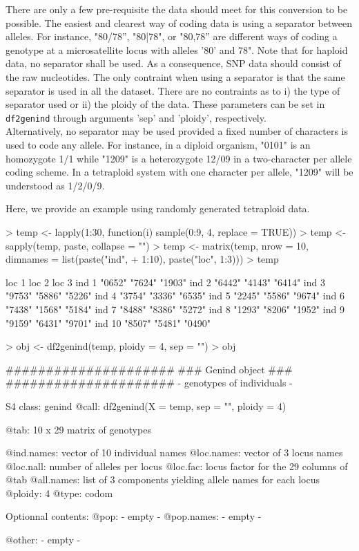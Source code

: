 \documentclass{article}
\begin{document}
There are only a few pre-requisite the data should meet for this conversion to be possible. The
easiest and clearest way of coding data is using a separator between alleles. For instance,
"80/78'', "80|78", or "80,78'' are different ways of coding a genotype at a microsatellite locus
with alleles '80' and 78".
Note that for haploid data, no separator shall be used.
As a consequence, SNP data should consist of the raw nucleotides.
The only contraint when using a separator is that the same separator is used in all the
dataset. There are no contraints as to i) the type of separator used or ii) the ploidy of the data.
These parameters can be set in \texttt{df2genind} through arguments 'sep' and 'ploidy', respectively.
\\

Alternatively, no separator may be used provided a fixed number of characters is used to code any allele.
For instance, in a diploid organism, "0101" is an homozygote 1/1 while "1209" is a heterozygote
12/09 in a two-character per allele coding scheme.
In a tetraploid system with one character per allele, "1209" will be understood as 1/2/0/9.

Here, we provide an example using randomly generated tetraploid data.
\begin{Schunk}
\begin{Sinput}
> temp <- lapply(1:30, function(i) sample(0:9, 4, replace = TRUE))
> temp <- sapply(temp, paste, collapse = "")
> temp <- matrix(temp, nrow = 10, dimnames = list(paste("ind", 
+     1:10), paste("loc", 1:3)))
> temp
\end{Sinput}
\begin{Soutput}
       loc 1  loc 2  loc 3 
ind 1  "0652" "7624" "1903"
ind 2  "6442" "4143" "6414"
ind 3  "9753" "5886" "5226"
ind 4  "3754" "3336" "6535"
ind 5  "2245" "5586" "9674"
ind 6  "7438" "1568" "5184"
ind 7  "8488" "8386" "5272"
ind 8  "1293" "8206" "1952"
ind 9  "9159" "6431" "9701"
ind 10 "8507" "5481" "0490"
\end{Soutput}
\begin{Sinput}
> obj <- df2genind(temp, ploidy = 4, sep = "")
> obj
\end{Sinput}
\begin{Soutput}
   #####################
   ### Genind object ### 
   #####################
- genotypes of individuals - 

S4 class:  genind
@call: df2genind(X = temp, sep = "", ploidy = 4)

@tab:  10 x 29 matrix of genotypes

@ind.names: vector of  10 individual names
@loc.names: vector of  3 locus names
@loc.nall: number of alleles per locus
@loc.fac: locus factor for the  29 columns of @tab
@all.names: list of  3 components yielding allele names for each locus
@ploidy:  4
@type:  codom

Optionnal contents: 
@pop:  - empty -
@pop.names:  - empty -

@other: - empty -
\end{Soutput}
\end{Schunk}
\end{document}
